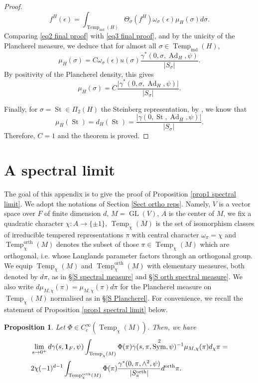 \documentclass[12pt]{article}
\newtheorem{prop}{Proposition}[section]
\numberwithin{equation}{section}
\DeclareMathOperator{\orth}{orth}
\DeclareMathOperator{\Temp}{Temp}
\DeclareMathOperator{\Ad}{Ad}
\DeclareMathOperator{\St}{St}
\DeclareMathOperator{\ind}{ind}
\DeclareMathOperator{\Sym}{Sym}
\DeclareMathOperator{\GL}{\mathrm{GL}}
\begin{document}
\begin{proof}
\begin{equation}
\displaystyle f^H(\epsilon)=\int_{\Temp_{\ind}(H)} \Theta_{\sigma}(f^{H}) \omega_\sigma(\epsilon) \mu_H(\sigma) d\sigma.
\end{equation}
Comparing \eqref{eq2 final proof} with \eqref{eq3 final proof}, and by the unicity of the Plancherel measure, we deduce that for almost all $\sigma\in \Temp_{\ind}(H)$,
\begin{equation*}
\displaystyle \mu_H(\sigma)=C \omega_\sigma(\epsilon)u(\sigma) \frac{\gamma^*(0,\sigma, \Ad_H,\psi)}{\lvert S_\sigma\rvert}.
\end{equation*}
By positivity of the Plancherel density, this gives
$$\mu_H(\sigma)=C\frac{\lvert \gamma^*(0,\sigma, \Ad_H,\psi)\rvert}{\lvert S_\sigma\rvert}.$$

Finally, for $\sigma=\St\in \Pi_2(H)$ the Steinberg representation, by \cite[\S 3.3]{HII}, we know that
$$\displaystyle \mu_H(\St)=d_H(\St)=\frac{\lvert \gamma(0,\St, \Ad_H,\psi)\rvert}{\lvert S_\sigma\rvert}.$$
Therefore, $C=1$ and the theorem is proved.
	\end{proof}
	
	
	
	\appendix
	
	\section{A spectral limit}
	
	The goal of this appendix is to give the proof of Proposition \ref{prop1 spectral limit}. We adopt the notations of Section \ref{Sect ortho reps}. Namely, $V$ is a vector space over $F$ of finite dimension $d$, $M=\GL(V)$, $A$ is the center of $M$, we fix a quadratic character $\chi: A\to \{\pm 1\}$, $\Temp_\chi(M)$ is the set of isomorphism classes of irreducible tempered representations $\pi$ with central character $\omega_\pi=\chi$ and $\Temp_\chi^{\orth}(M)$ denotes the subset of those $\pi\in \Temp_\chi(M)$ which are orthogonal, i.e. whose Langlands parameter factors through an orthogonal group. We equip $\Temp_\chi(M)$ and $\Temp_\chi^{\orth}(M)$ with elementary measures, both denoted by $d\pi$, as in \S \ref{S spectral measure} and \S \ref{S orth spectral measure}. We also write $d\mu_{M,\chi}(\pi)=\mu_{M,\chi}(\pi)d\pi$ for the Plancherel measure on $\Temp_{\chi}(M)$ normalised as in \S \ref{S Plancherel}. For convenience, we recall the statement of Proposition \ref{prop1 spectral limit} below.
	
	\begin{prop}\label{prop spectral limit}
		Let $\Phi\in C_c^\infty(\Temp_\chi(M))$. Then, we have
		\[\begin{aligned}
			\displaystyle & \lim\limits_{s\to 0^+} d\gamma(s,\mathbf{1}_F,\psi)\int_{\Temp_\chi(M)} \Phi(\pi) \gamma(s,\pi,\Sym^2,\psi)^{-1} \mu_{M,\chi}(\pi)d_\chi\pi= \\
			& 2\chi(-1)^{d-1}\int_{\Temp^{\orth}_\chi(M)} \Phi(\pi) \frac{\gamma^*(0,\pi,\wedge^2,\psi)}{\lvert S_\pi^{\orth}\rvert} d^{\orth}\pi.
		\end{aligned}\]
	\end{prop}
	
\end{document}
